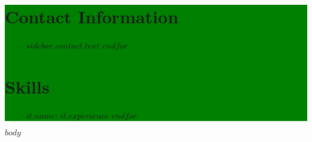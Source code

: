 \documentclass{article}
\providecommand{\tightlist}{\setlength{\itemsep}{0pt}\setlength{\parskip}{0pt}}
\begin{document}
\newcommand{\hreful}[2]{
    \href{#1}{
        \textcolor{blue}{\ttfamily\underline{#2}}
    }
}



\colorbox{green}{
\begin{minipage}{0.35\linewidth}
  \section{Contact Information}\label{contact}
  \begin{itemize}
      \tightlist
      $for(sidebar.contact)$
        \item[--] $sidebar.contact.text$
      $endfor$
  \end{itemize}

  \section{Skills}\label{skills}
  \begin{itemize}
      \tightlist
      $for(sidebar.skills)$
        \item[--] $it.name$: $it.experience$
      $endfor$
  \end{itemize}

\end{minipage}}
\begin{minipage}{0.65\linewidth}


$body$

\end{minipage}
\end{document}
